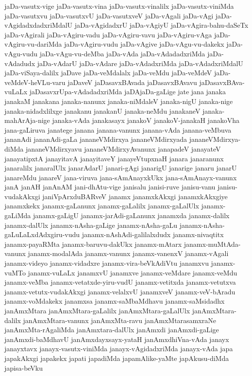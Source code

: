 {jaDa-vasutx-vige
jaDa-vasutx-vina
jaDa-vasutx-vinalilx
jaDa-vasutx-viniMda
jaDa-vasutxvu
jaDa-vasutxvU
jaDa-vasutxveV
jaDa-vAgali
jaDa-vAgi
jaDa-vAgidadxdadxriMdalU
jaDa-vAgidadxrU
jaDa-vAgiyU
jaDa-vAgira-bahu-daSeTx
jaDa-vAgirali
jaDa-vAgiru-vadu
jaDa-vAgiru-vavu
jaDa-vAgiru-vAga
jaDa-vAgiru-vu-dariMda
jaDa-vAgiru-vudu
jaDa-vAgive
jaDa-vAgu-vu-dakekx
jaDa-vAgu-vudu
jaDa-vAgu-vu-deMba
jaDa-vAda
jaDa-vAdadadxriMda
jaDa-vAdadudx
jaDa-vAdarU
jaDa-vAdare
jaDa-vAdadxriMda
jaDa-vAdadxriMdalU
jaDa-viSaya-dalilx
jaDave
jaDa-veMdalalx
jaDa-veMdu
jaDa-veMdeV
jaDa-veMdeV-heVLu-varu
jaDaveV
jaDasavxBAvada
jaDasavxBAvavu
jaDasavxBAva-vuLaLx
jaDasavxrUpa-vAdadadxriMda
jaDAjaDa-gaLige
jate
jana
janaka
janakaM
janakana
janaka-nanunx
janaka-niMdaleV
janaka-nigU
janaka-nige
janaka-nidadxlilxge
janakanu
janakanU
janaka-neMdu
janakaneV
janaka-mahArAja-nige
janaka-vAda
janakasayx
janakoV
janakoV-janakaH
janakoVha
jana-gaLiruva
janatege
janana
janana-vanunx
janana-vAda
janana-veMbuva
jananAdi
jananAdi-gaLa
jananeVMdirxya
jananeVMdirxyada
jananeVMdirxya-diMda
jananeVMdirxyavu
jananeVMdirxyAvanunx
janapadeV
janayateV
janayatipxtA
janayitavA
janayitaveY
janayeVtupxnaH
janara
janaranunx
janaralilx
janaralUlx
janarAdarU
janari-gAgi
janarigU
janarige
janaru
janarU
janareMdu
janareV
jana-viruva
jana-sAmAnayxkUkx
jana-sAmAnayx-vanunx
janA
janAH
janAnAM
jani-dhAtu-vige
janisalu
janisi-ruve
janisu-vanu
janisu-vudakAkxgi
janiVpArxduBARveV
janamx
janamxkAkxgi
janamxkAkxgiye
janamxkekx
janamx-gaLanunx
janamx-gaLalilx
janamx-gaLalUlx
janamx-gaLiMda
janamx-gaLigU
janamx-jarAdi-gaLanunx
janamxda
janamx-dalilx
janamx-dalUlx
janamx-nAsha-gaLige
janamx-nAsha-gaLu
janamx-nAsha-gaLuLaLxdAdxgiru-vudu
janamx-nAshAdi-galilalxdudx
janamx-nivaqtitx
janamx-payaRMta
janamx-baruvu-dakUkx
janamx-mAtarx
janamx-muMtAda-vanunx
janamx-modalAda
janamx-vanunx
janamx-vanenxV
janamx-vAgali
janamx-videyo
janamx-vidadxre
janamx-vira-beVkAdiVtu
janamxvu
janamx-vuMTo
janamx-vuLaLx
janamxvU
janamxve
janamx-veMdare
janamx-veMdu
janamx-veMba
janamx-vetatxde-yiru-vudU
janamx-vetitxda
janamx-vetutxva
janamx-vetutx-vudakAkxgi
janamx-velalxvU
janamxveV
janamx-veV-bAradu
janamx-voMdakekx
janamxsa
janamx-saMbaMdhavu
janamx-saMsidadhx
janAmxMtara
janAmxMtara-gaLalilx
janAmxMtara-gaLalUlx
janAmxMtara-dalilx
janAmxMtara-vanunx
janAmxMta-ravu
janAmxMtarasamxraNe
janAmxMta-rAgaliMda
janAmxtara-dalUlx
janAmxdi
janAmxdi-gaLige
janAmxdi-baMdhavU
janAmxdayxsayx-yataH
janAmxdhiVna-vAda
janayx
janayxtavx
janayx-vasutx-viniMda
janayx-vAgidadxriMda
janayx-vAda
japa
japakAkxgi
japakekx
japati
japadiMda
japamAlike-yaMte
japAkusu-diMda
japisa-beVku
}
